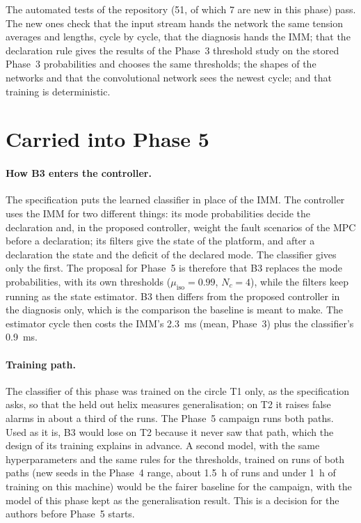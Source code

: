 \documentclass[10pt]{article}
\begin{document}
The automated tests of the repository (51, of which 7 are new in this phase) pass. The new ones check that the input stream hands the network the same tension averages and lengths, cycle by cycle, that the diagnosis hands the IMM; that the declaration rule gives the results of the Phase~3 threshold study on the stored Phase~3 probabilities and chooses the same thresholds; the shapes of the networks and that the convolutional network sees the newest cycle; and that training is deterministic.

\section{Carried into Phase 5}\label{sec:next}

\paragraph{How B3 enters the controller.} The specification puts the learned classifier in place of the IMM. The controller uses the IMM for two different things: its mode probabilities decide the declaration and, in the proposed controller, weight the fault scenarios of the MPC before a declaration; its filters give the state of the platform, and after a declaration the state and the deficit of the declared mode. The classifier gives only the first. The proposal for Phase~5 is therefore that B3 replaces the mode probabilities, with its own thresholds ($\mu_{\mathrm{iso}}=0.99$, $N_c=4$), while the filters keep running as the state estimator. B3 then differs from the proposed controller in the diagnosis only, which is the comparison the baseline is meant to make. The estimator cycle then costs the IMM's 2.3~ms (mean, Phase~3) plus the classifier's 0.9~ms.

\paragraph{Training path.} The classifier of this phase was trained on the circle T1 only, as the specification asks, so that the held out helix measures generalisation; on T2 it raises false alarms in about a third of the runs. The Phase~5 campaign runs both paths. Used as it is, B3 would lose on T2 because it never saw that path, which the design of its training explains in advance. A second model, with the same hyperparameters and the same rules for the thresholds, trained on runs of both paths (new seeds in the Phase~4 range, about 1.5~h of runs and under 1~h of training on this machine) would be the fairer baseline for the campaign, with the model of this phase kept as the generalisation result. This is a decision for the authors before Phase~5 starts.





\end{document}
